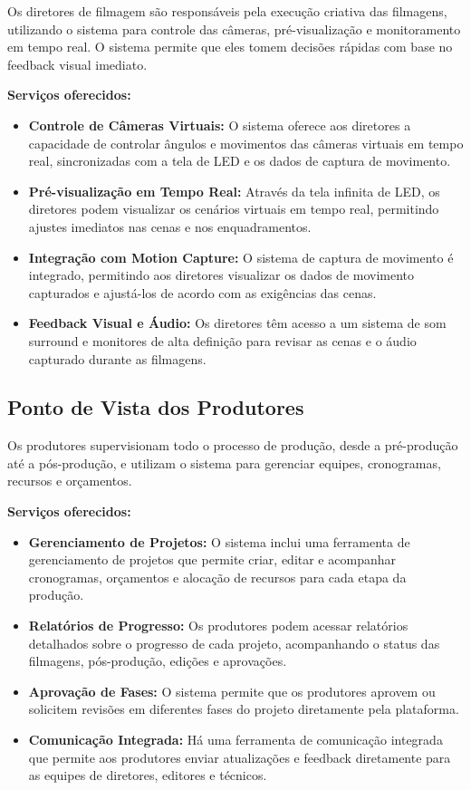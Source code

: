 Os diretores de filmagem são responsáveis pela execução criativa das filmagens, utilizando o sistema para controle das câmeras, pré-visualização e monitoramento em tempo real. O sistema permite que eles tomem decisões rápidas com base no feedback visual imediato.

\textbf{Serviços oferecidos:}
\begin{itemize}
  \item \textbf{Controle de Câmeras Virtuais:} O sistema oferece aos diretores a capacidade de controlar ângulos e movimentos das câmeras virtuais em tempo real, sincronizadas com a tela de LED e os dados de captura de movimento.
  \item \textbf{Pré-visualização em Tempo Real:} Através da tela infinita de LED, os diretores podem visualizar os cenários virtuais em tempo real, permitindo ajustes imediatos nas cenas e nos enquadramentos.
  \item \textbf{Integração com Motion Capture:} O sistema de captura de movimento é integrado, permitindo aos diretores visualizar os dados de movimento capturados e ajustá-los de acordo com as exigências das cenas.
  \item \textbf{Feedback Visual e Áudio:} Os diretores têm acesso a um sistema de som surround e monitores de alta definição para revisar as cenas e o áudio capturado durante as filmagens.
\end{itemize}

\subsection{Ponto de Vista dos Produtores}

Os produtores supervisionam todo o processo de produção, desde a pré-produção até a pós-produção, e utilizam o sistema para gerenciar equipes, cronogramas, recursos e orçamentos.

\textbf{Serviços oferecidos:}
\begin{itemize}
  \item \textbf{Gerenciamento de Projetos:} O sistema inclui uma ferramenta de gerenciamento de projetos que permite criar, editar e acompanhar cronogramas, orçamentos e alocação de recursos para cada etapa da produção.
  \item \textbf{Relatórios de Progresso:} Os produtores podem acessar relatórios detalhados sobre o progresso de cada projeto, acompanhando o status das filmagens, pós-produção, edições e aprovações.
  \item \textbf{Aprovação de Fases:} O sistema permite que os produtores aprovem ou solicitem revisões em diferentes fases do projeto diretamente pela plataforma.
  \item \textbf{Comunicação Integrada:} Há uma ferramenta de comunicação integrada que permite aos produtores enviar atualizações e feedback diretamente para as equipes de diretores, editores e técnicos.
\end{itemize}

